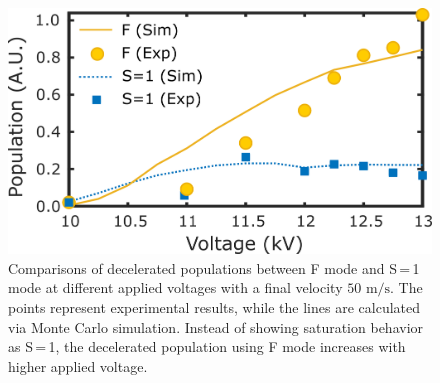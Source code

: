 \documentclass[%
 reprint,
 amsmath,amssymb,
 aps,
prl,
]{revtex4-1}
\begin{document}
\begin{figure}[t]
\includegraphics[width=\linewidth]{Figure4.png}
\vspace{-15pt}
\caption{\label{fig:voltage}
Comparisons of decelerated populations between F mode and S\,=\,1 mode at different applied voltages with a final velocity $50 \text{ m/s}$. 
The points represent experimental results, while the lines are calculated via Monte Carlo simulation. 
Instead of showing saturation behavior as S\,=\,1, the decelerated population using F mode increases with higher applied voltage.
\vspace{-15pt}}
\end{figure}


\end{document}
